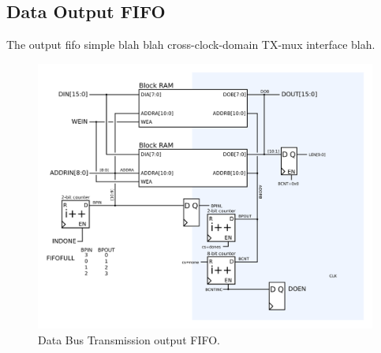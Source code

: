 \subsection{Data Output FIFO}
The output fifo simple blah blah cross-clock-domain TX-mux interface blah. 

\begin{figure}
\begin{centering}
\includegraphics[scale=0.8]{data.outputfifo.svg}
\end{centering}
\caption{Data Bus Transmission output FIFO.}
\label{data.outputfifo}
\end{figure}
